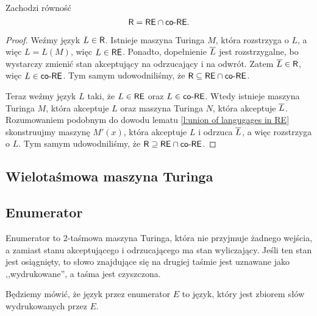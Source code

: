 \begin{theorem}
    Zachodzi równość
    \[ \textsf{R} = \textsf{RE} \cap \textsf{co-RE}. \]
\end{theorem}
\begin{proof}
    Weźmy język $L \in \textsf{R}$. Istnieje maszyna Turinga $M$, która rozstrzyga o $L$, a więc $L = L(M)$, więc $L \in \textsf{RE}$. Ponadto, dopełnienie $\overline{L}$ jest rozstrzygalne, bo wystarczy zmienić stan akceptujący na odrzucający i na odwrót. Zatem $\overline{L} \in \textsf{R}$, więc $L \in \textsf{co-RE}$. Tym samym udowodniliśmy, że $\textsf{R} \subseteq \textsf{RE} \cap \textsf{co-RE}$.

    Teraz weźmy język $L$ taki, że $L \in \textsf{RE}$ oraz $L \in \textsf{co-RE}$. Wtedy istnieje maszyna Turinga $M$, która akceptuje $L$ oraz maszyna Turinga $N$, która akceptuje $\overline{L}$. Rozumowaniem podobnym do dowodu lematu \ref{l:union of langugages in RE} skonstruujmy maszynę $M'(x)$, która akceptuje $L$ i odrzuca $\overline{L}$, a więc rozstrzyga o $L$. Tym samym udowodniliśmy, że $\textsf{R} \supseteq \textsf{RE} \cap \textsf{co-RE}$.
\end{proof}

\subsection{Wielotaśmowa maszyna Turinga}

\subsection{Enumerator}
\begin{definition}
    Enumerator to 2-taśmowa maszyna Turinga, która nie przyjmuje żadnego wejścia, a zamiast stanu akceptującego i odrzucającego ma stan wyliczający. Jeśli ten stan jest osiągnięty, to słowo znajdujące się na drugiej taśmie jest uznawane jako ,,wydrukowane'', a taśma jest czyszczona.
\end{definition}

Będziemy mówić, że język  przez enumerator $E$ to język, który jest zbiorem słów wydrukowanych przez $E$.

